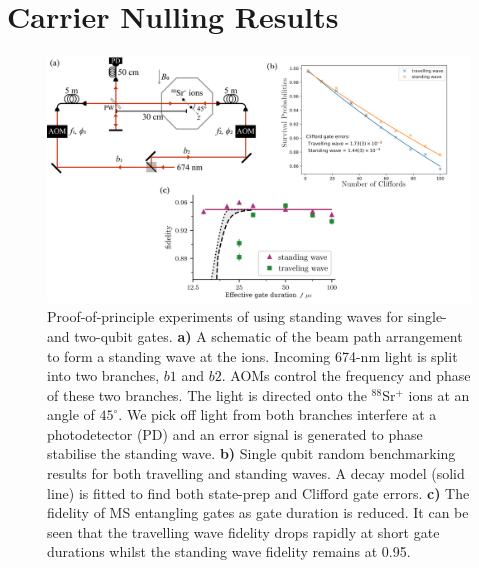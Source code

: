 \documentclass[12pt]{iopart}
\begin{document}


\section{Carrier Nulling Results}

\begin{figure}
  \begin{center}
   \noindent\includegraphics[width=\linewidth]{figures/cnulled_figs.png}
  \end{center}
  \caption{  Proof-of-principle experiments of using standing waves for single- and two-qubit gates\cite{saner_breaking_2023}.
    \textbf{a)} A schematic of the beam path arrangement to form a
    standing wave at the ions. Incoming 674-nm light is split into two
    branches, $b1$ and $b2$. AOMs control the frequency and phase of
    these two branches. The light is directed onto the $^{88}$Sr$^+$
    ions at an angle of $45^\circ.$ We pick off light from both
    branches interfere at a photodetector (PD) and an error signal is
    generated to phase stabilise the standing wave.  \textbf{b)}
    Single qubit random benchmarking results for both travelling and
    standing waves. A decay model (solid line) is fitted to find both
    state-prep and Clifford gate errors.  \textbf{c)} The fidelity of
    MS entangling gates as gate duration is reduced. It can be seen
    that the travelling wave fidelity drops rapidly at short gate
    durations whilst the standing wave fidelity remains at 0.95.}


  \label{fig:cnull}
\end{figure}
\end{document}
